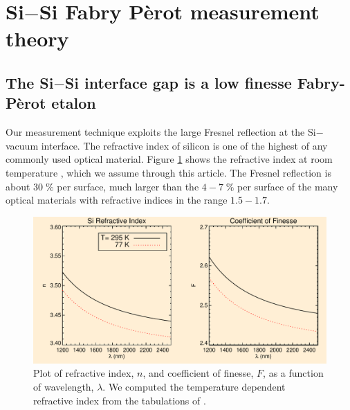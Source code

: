 \section{Si$-$Si Fabry P\`{e}rot measurement theory}

\subsection{The Si$-$Si interface gap is a low finesse Fabry-P\`{e}rot etalon}

Our measurement technique exploits the large Fresnel reflection \cite{2001opt4.book.....H} at the Si$-$vacuum interface.  The refractive index of silicon is one of the highest of any commonly used optical material.  Figure \ref{figSiIndexFinesse} shows the refractive index at room temperature \cite{2006SPIE.6273E..77F}, which we assume through this article.  The Fresnel reflection is about $30\;\%$ per surface, much larger than the $4-7\;\%$ per surface of the many optical materials with refractive indices in the range $1.5-1.7$.

\begin{figure}[htbp]
\includegraphics[width=0.95\columnwidth]{chSiGaps/figs/SiIndexAOmgsFinesseFig.pdf}
\caption[Si refractive index and Finesse as a function of wavelength]{Plot of refractive index, $n$, and coefficient of finesse, $F$, as a function of wavelength, $\lambda$.   We computed the temperature dependent refractive index from the tabulations of \cite{2006SPIE.6273E..77F}.  \label{figSiIndexFinesse}}
\end{figure}

